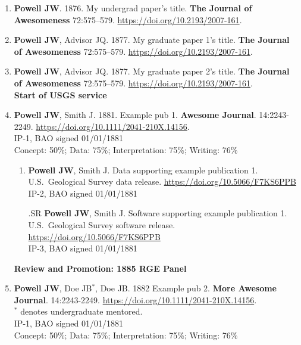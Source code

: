 \begin{enumerate}
  \item
  \textbf{Powell JW}.
  1876.
  My undergrad paper's title.
  \textbf{The Journal of Awesomeness} 72:575--579.
  \url{https://doi.org/10.2193/2007-161}.\label{paper1}
  
  \item
  \textbf{Powell JW}, Advisor JQ.
  1877.
  My graduate paper 1's title.
  \textbf{The Journal of Awesomeness} 72:575--579.
  \url{https://doi.org/10.2193/2007-161}.\label{paper2}

  \item
  \textbf{Powell JW}, Advisor JQ.
  1877.
  My graduate paper 2's title.
  \textbf{The Journal of Awesomeness} 72:575--579.
  \url{https://doi.org/10.2193/2007-161}.\label{paper3} \\

  \noindent\makebox[\linewidth]{\rule{\textwidth}{1pt}}
  \textbf{Start of USGS service} 

  \item
  \textbf{Powell JW}, Smith J.
  1881.
  Example pub 1.
  \textbf{Awesome Journal}. 14:2243-2249.
  \url{https://doi.org/10.1111/2041-210X.14156}.\\
  IP-1, BAO signed 01/01/1881  \\
  Concept: 50\%; Data: 75\%; Interpretation: 75\%;
  Writing: 76\% \label{example1}
  
  \begin{enumerate}
    \item
    \textbf{Powell JW}, Smith J.
      Data supporting example publication 1.
      U.S.~Geological Survey data release.
      \url{https://doi.org/10.5066/F7KS6PPB} \\
      IP-2, BAO signed 01/01/1881
    \item[\theenumi.SR]
    \textbf{Powell JW}, Smith J.
    Software supporting example publication 1.
    U.S.~Geological Survey software release.
    \url{https://doi.org/10.5066/F7KS6PPB} \\
    IP-3, BAO signed 01/01/1881 
  \end{enumerate}

  
  \noindent\makebox[\linewidth]{\rule{\textwidth}{1pt}} 
  
  \textbf{Review and Promotion: 1885 RGE Panel} 

  \item 
  \textbf{Powell JW}, Doe JB\(^*\), Doe JB.
  1882
  Example pub 2.
  \textbf{More Awesome Journal}. 14:2243-2249.
  \url{https://doi.org/10.1111/2041-210X.14156}.\\
  \(^*\) denotes undergraduate mentored. \\
  IP-1, BAO signed 01/01/1881  \\
  Concept: 50\%; Data: 75\%; Interpretation: 75\%;
  Writing: 76\% \label{example2}
  

\end{enumerate}
